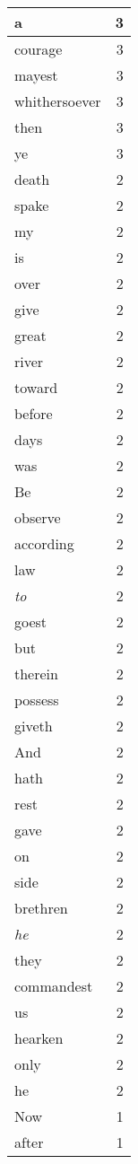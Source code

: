 \begin{center}
\begin{longtable}{l|r}
a & 3 \\ \hline
courage & 3 \\ \hline
mayest & 3 \\ \hline
whithersoever & 3 \\ \hline
then & 3 \\ \hline
ye & 3 \\ \hline
death & 2 \\ \hline
spake & 2 \\ \hline
my & 2 \\ \hline
is & 2 \\ \hline
over & 2 \\ \hline
give & 2 \\ \hline
great & 2 \\ \hline
river & 2 \\ \hline
toward & 2 \\ \hline
before & 2 \\ \hline
days & 2 \\ \hline
was & 2 \\ \hline
Be & 2 \\ \hline
observe & 2 \\ \hline
according & 2 \\ \hline
law & 2 \\ \hline
\emph{to} & 2 \\ \hline
goest & 2 \\ \hline
but & 2 \\ \hline
therein & 2 \\ \hline
possess & 2 \\ \hline
giveth & 2 \\ \hline
And & 2 \\ \hline
hath & 2 \\ \hline
rest & 2 \\ \hline
gave & 2 \\ \hline
on & 2 \\ \hline
side & 2 \\ \hline
brethren & 2 \\ \hline
\emph{he} & 2 \\ \hline
they & 2 \\ \hline
commandest & 2 \\ \hline
us & 2 \\ \hline
hearken & 2 \\ \hline
only & 2 \\ \hline
he & 2 \\ \hline
Now & 1 \\ \hline
after & 1 \\ \hline

\end{longtable}
\end{center}
